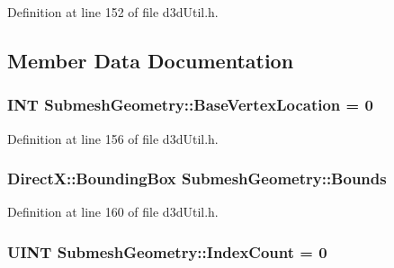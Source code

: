 Definition at line 152 of file d3d\+Util.\+h.



\subsection{Member Data Documentation}
\subsubsection[{\texorpdfstring{Base\+Vertex\+Location}{BaseVertexLocation}}]{\setlength{\rightskip}{0pt plus 5cm}I\+NT Submesh\+Geometry\+::\+Base\+Vertex\+Location = 0}\hypertarget{struct_submesh_geometry_a95e805e2c8022aea5826d7343ee7dc20_a95e805e2c8022aea5826d7343ee7dc20}{}\label{struct_submesh_geometry_a95e805e2c8022aea5826d7343ee7dc20_a95e805e2c8022aea5826d7343ee7dc20}


Definition at line 156 of file d3d\+Util.\+h.

\subsubsection[{\texorpdfstring{Bounds}{Bounds}}]{\setlength{\rightskip}{0pt plus 5cm}Direct\+X\+::\+Bounding\+Box Submesh\+Geometry\+::\+Bounds}\hypertarget{struct_submesh_geometry_ac79bad539c71ede2aa15b2527cacaa97_ac79bad539c71ede2aa15b2527cacaa97}{}\label{struct_submesh_geometry_ac79bad539c71ede2aa15b2527cacaa97_ac79bad539c71ede2aa15b2527cacaa97}


Definition at line 160 of file d3d\+Util.\+h.

\subsubsection[{\texorpdfstring{Index\+Count}{IndexCount}}]{\setlength{\rightskip}{0pt plus 5cm}U\+I\+NT Submesh\+Geometry\+::\+Index\+Count = 0}\hypertarget{struct_submesh_geometry_ab28b180ab73cabb07553c76f3f32c180_ab28b180ab73cabb07553c76f3f32c180}{}\label{struct_submesh_geometry_ab28b180ab73cabb07553c76f3f32c180_ab28b180ab73cabb07553c76f3f32c180}


